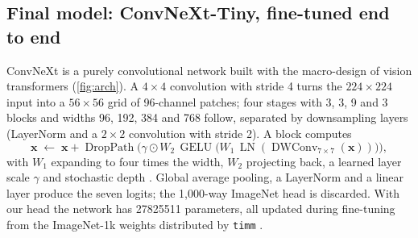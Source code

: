 \documentclass[11pt,a4paper]{article}
\begin{document}


\subsection{Final model: ConvNeXt-Tiny, fine-tuned end to end}
ConvNeXt \cite{liu2022convnext} is a purely convolutional network built with the macro-design of vision transformers (\cref{fig:arch}). A $4\times4$ convolution with stride 4 turns the $224\times224$ input into a $56\times56$ grid of 96-channel patches; four stages with 3, 3, 9 and 3 blocks and widths 96, 192, 384 and 768 follow, separated by downsampling layers (LayerNorm and a $2\times2$ convolution with stride 2). A block computes
\begin{equation}
  \bm{x} \;\leftarrow\; \bm{x} + \operatorname{DropPath}\!\Big(\gamma\odot W_2\,\operatorname{GELU}\big(W_1\,\operatorname{LN}(\operatorname{DWConv}_{7\times7}(\bm{x}))\big)\Big),
\end{equation}
with $W_1$ expanding to four times the width, $W_2$ projecting back, a learned layer scale $\gamma$ and stochastic depth \cite{huang2016stochasticdepth}. Global average pooling, a LayerNorm and a linear layer produce the seven logits; the 1{,}000-way ImageNet head is discarded. With our head the network has \num{27825511} parameters, all updated during fine-tuning from the ImageNet-1k weights distributed by \texttt{timm} \cite{wightman2019timm}.
\end{document}
